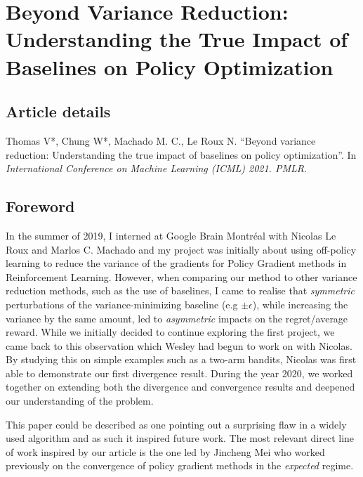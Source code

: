 











\chapter{Beyond Variance Reduction: Understanding the True Impact of Baselines on Policy Optimization}
\label{chapter:baselines}
\section*{Article details}
Thomas V*, Chung W*, Machado M. C., Le Roux N. ``Beyond variance reduction: Understanding the true impact of baselines on policy optimization''. In \emph{International Conference on Machine Learning (ICML) 2021. PMLR}.

\section*{Foreword}
In the summer of 2019, I interned at Google Brain Montr\'{e}al with Nicolas Le Roux and Marlos C. Machado and my project was initially about using off-policy learning to reduce the variance of the gradients for Policy Gradient methods in Reinforcement Learning. However, when comparing our method to other variance reduction methods, such as the use of baselines, I came to realise that \emph{symmetric} perturbations of the variance-minimizing baseline (e.g $\pm \epsilon$), while increasing the variance by the same amount, led to \emph{asymmetric} impacts on the regret/average reward. While we initially decided to continue exploring the first project, we came back to this observation which Wesley had begun to work on with Nicolas. By studying this on simple examples such as a two-arm bandits, Nicolas was first able to demonstrate our first divergence result. During the year 2020, we worked together on extending both the divergence and convergence results and deepened our understanding of the problem.

This paper could be described as one pointing out a surprising flaw in a widely used algorithm and as such it inspired future work. The most relevant direct line of work inspired by our article is the one led by Jincheng Mei who worked previously on the convergence of policy gradient methods in the \emph{expected} regime. 


